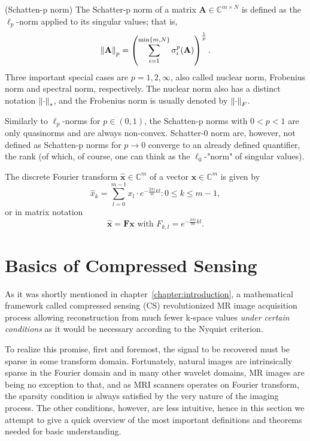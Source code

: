 \begin{tight_equations}
\begin{definition}(Schatten-p norm)
The Schatter-p norm of a matrix $\mathbf{A} \in \mathbb{C}^{m \times N}$ is defined as the $\ell_p$-norm applied to its singular values; that is,
\[\left\lVert\mathbf{A}\right\rVert_p = \left(\sum_{i=1}^{\min\{m,N\}}\sigma_i^p(\mathbf{A})\right)^\frac{1}{p}.\]
Three important special cases are $p = 1, 2, \infty$, also called nuclear norm, Frobenius norm and spectral norm, respectively. The nuclear norm also has a distinct notation $\left\lVert\cdot\right\rVert_*$, and the Frobenius norm is usually denoted by $\left\lVert\cdot\right\rVert_F$.
\end{definition}

\begin{remark}
Similarly to $\ell_p$-norms for $p \in (0,1)$, the Schatten-p norms with $0 < p < 1$ are only quasinorms and are always non-convex. Schatter-0 norm are, however, not defined as Schatten-p norms for $p \rightarrow 0$ converge to an already defined quantifier, the rank (of which, of course, one can think as the $\ell_0$-"norm" of singular values).
\end{remark}

\begin{definition}
The discrete Fourier transform $\mathbf{\hat{x}} \in \mathbb{C}^m$ of a vector $\mathbf{x} \in \mathbb{C}^m$ is given by
\[\hat{x}_k = \sum_{l = 0}^{m-1} x_l \cdot e^{-\frac{2\pi i}{m}kl} : 0 \le k \le m-1,\]
or in matrix notation
\[\mathbf{\hat{x}} = \mathbf{Fx} \text{ with } F_{k,l} = e^{-\frac{2\pi i}{m}kl}.\]
\end{definition}

\end{tight_equations}

\section{Basics of Compressed Sensing}
As it was shortly mentioned in chapter~\ref{chapter:introduction}, a mathematical framework called compressed sensing (CS) revolutionized MR image acquisition process allowing reconstruction from much fewer k-space values \textit{under certain conditions} as it would be necessary according to the Nyquist criterion.

To realize this promise, first and foremost, the signal to be recovered must be sparse in some transform domain. Fortunately, natural images are intrinsically sparse in the Fourier domain and in many other wavelet domains, MR images are being no exception to that, and as MRI scanners operates on Fourier transform, the sparsity condition is always satisfied by the very nature of the imaging process. The other conditions, however, are less intuitive, hence in this section we attempt to give a quick overview of the most important definitions and theorems needed for basic understanding.

